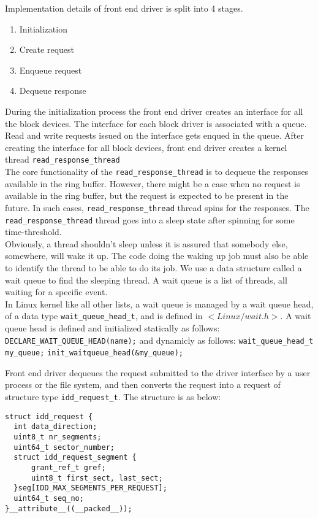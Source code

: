 Implementation details of front end driver is split into 4 stages. 
\begin{enumerate}
\item Initialization
\item Create request
\item Enqueue request 
\item Dequeue response
\end{enumerate}

During the initialization process the front end driver creates an interface for all the block devices. The interface for each block driver is associated with a queue. Read and write requests issued on the interface gets enqued in the queue. After creating the interface for all block devices, front end driver creates a kernel thread \texttt{read\_response\_thread}
\\
The core functionality of the \texttt{read\_response\_thread} is to dequeue the responses available in the ring buffer. However, there might be a case when no request is available in the ring buffer, but the request is expected to be present in the future. In such cases, \texttt{read\_response\_thread} thread spins for the responses. The \texttt{read\_response\_thread} thread goes into a sleep state after spinning for some time-threshold. 
\\
Obviously, a thread shouldn't sleep unless it is assured that somebody else, somewhere, will wake it up. The code doing the waking up job must also be able to identify the thread to be able to do its job. We use a data structure called a wait queue to find the sleeping thread. A wait queue is a list of threads, all waiting for a specific event\cite{galvin, Bovet:2005:ULK:1077084}.
\\
In Linux kernel like all other lists, a wait queue is managed by a wait queue head, of a data type \texttt{wait\_queue\_head\_t}, and is defined in \texttt{$<Linux/wait.h>$}. A wait queue head is defined and initialized statically as follows:
\texttt{DECLARE\_WAIT\_QUEUE\_HEAD(name);}
and dynamicly as follows:
\texttt{wait\_queue\_head\_t my\_queue;}
\texttt{init\_waitqueue\_head(\&my\_queue);}

Front end driver dequeues the request submitted to the driver interface by a user process or the file system, and then converts the request into a request of structure type \texttt{idd\_request\_t}. The structure is as below:

\begin{verbatim}
struct idd_request {
  int data_direction; 
  uint8_t nr_segments;
  uint64_t sector_number;
  struct idd_request_segment {
      grant_ref_t gref;
      uint8_t first_sect, last_sect;
  }seg[IDD_MAX_SEGMENTS_PER_REQUEST];
  uint64_t seq_no;
}__attribute__((__packed__));
\end{verbatim}

